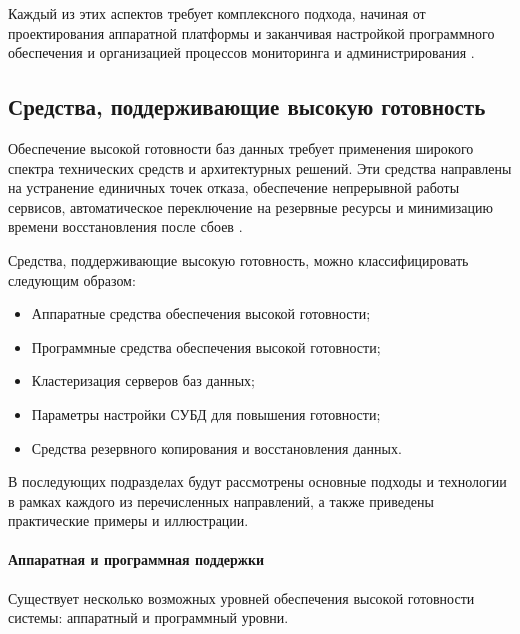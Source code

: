 Каждый из этих аспектов требует комплексного подхода, начиная от проектирования аппаратной платформы и заканчивая настройкой программного обеспечения и организацией процессов мониторинга и администрирования \autocite{Kleppmann}.

\subsection{Средства, поддерживающие высокую готовность}

Обеспечение высокой готовности баз данных требует применения широкого спектра технических средств и архитектурных решений. Эти средства направлены на устранение единичных точек отказа, обеспечение непрерывной работы сервисов, автоматическое переключение на резервные ресурсы и минимизацию времени восстановления после сбоев \autocite{RajeshKumar, SameerParadkar}.

Средства, поддерживающие высокую готовность, можно классифицировать следующим образом:
\begin{itemize}
    \item Аппаратные средства обеспечения высокой готовности;
    \item Программные средства обеспечения высокой готовности;
    \item Кластеризация серверов баз данных;
    \item Параметры настройки СУБД для повышения готовности;
    \item Средства резервного копирования и восстановления данных.
\end{itemize}

В последующих подразделах будут рассмотрены основные подходы и технологии в рамках каждого из перечисленных направлений, а также приведены практические примеры и иллюстрации.


\paragraph{Аппаратная и программная поддержки}
Существует несколько возможных уровней обеспечения высокой готовности системы: аппаратный и программный уровни. \\
